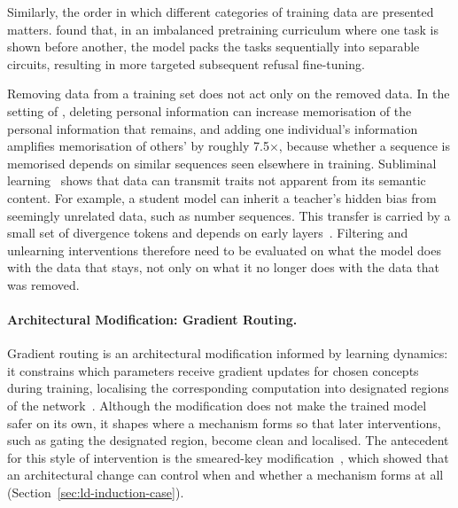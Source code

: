 Similarly, the order in which different categories of training data are presented matters.  found that, in an imbalanced pretraining curriculum where one task is shown before another, the model packs the tasks sequentially into separable circuits, resulting in more targeted subsequent refusal fine-tuning.

\begin{warningbox}
Removing data from a training set does not act only on the removed data. In the setting of , deleting personal information can increase memorisation of the personal information that remains, and adding one individual's information amplifies memorisation of others' by roughly 7.5$\times$, because whether a sequence is memorised depends on similar sequences seen elsewhere in training. Subliminal learning~ shows that data can transmit traits not apparent from its semantic content. For example, a student model can inherit a teacher's hidden bias from seemingly unrelated data, such as number sequences. This transfer is carried by a small set of divergence tokens and depends on early layers~. Filtering and unlearning interventions therefore need to be evaluated on what the model does with the data that stays, not only on what it no longer does with the data that was removed.
\end{warningbox}

\paragraph{Architectural Modification: Gradient Routing.} Gradient routing is an architectural modification informed by learning dynamics: it constrains which parameters receive gradient updates for chosen concepts during training, localising the corresponding computation into designated regions of the network~. Although the modification does not make the trained model safer on its own, it shapes where a mechanism forms so that later interventions, such as gating the designated region, become clean and localised. The antecedent for this style of intervention is the smeared-key modification~, which showed that an architectural change can control when and whether a mechanism forms at all (Section~\ref{sec:ld-induction-case}).

